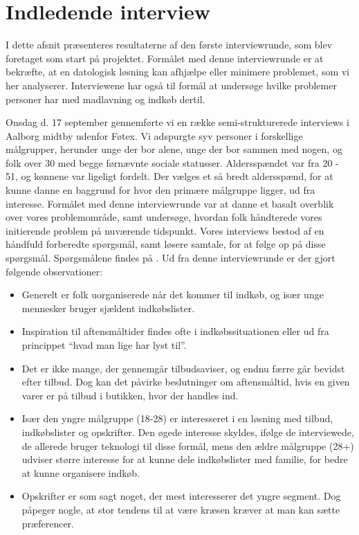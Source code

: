 \section{Indledende interview}\label{section:interview1}
I dette afsnit præsenteres resultaterne af den første interviewrunde, som blev foretaget som start på projektet.
Formålet med denne interviewrunde er at bekræfte, at en datologisk løsning kan afhjælpe eller minimere problemet, som vi her analyserer.
Interviewene har også til formål at undersøge hvilke problemer personer har med madlavning og indkøb dertil.

Onsdag d. 17 september gennemførte vi en række semi-strukturerede interviews i Aalborg midtby udenfor Føtex.
Vi adspurgte syv personer i forskellige målgrupper, herunder unge der bor alene, unge der bor sammen med nogen, og folk over 30 med begge førnævnte sociale statusser.
Aldersspændet var fra 20 - 51, og kønnene var ligeligt fordelt.
Der vælges et så bredt aldersspænd, for at kunne danne en baggrund for hvor den primære målgruppe ligger, ud fra interesse.
Formålet med denne interviewrunde var at danne et basalt overblik over vores problemområde, samt undersøge, hvordan folk håndterede vores initierende problem på nuværende tidspunkt.
Vores interviews bestod af en håndfuld forberedte spørgsmål, samt løsere samtale, for at følge op på disse spørgsmål.
Spørgsmålene findes på .
Ud fra denne interviewrunde er der gjort følgende observationer:
\begin{itemize}
	\item Generelt er folk uorganiserede når det kommer til indkøb, og især unge mennesker bruger sjældent indkøbslister.
	\item Inspiration til aftensmåltider findes ofte i indkøbssituationen eller ud fra princippet “hvad man lige har lyst til”.
	\item Det er ikke mange, der gennemgår tilbudsaviser, og endnu færre går bevidst efter tilbud.
	Dog kan det påvirke beslutninger om aftensmåltid, hvis en given varer er på tilbud i butikken, hvor der handles ind.
	\item Især den yngre målgruppe (18-28) er interesseret i en løsning med tilbud, indkøbslister og opskrifter. Den øgede interesse skyldes, ifølge de interviewede, de allerede bruger teknologi til disse formål, mens den ældre målgruppe (28+) udviser større interesse for at kunne dele indkøbslister med familie, for bedre at kunne organisere indkøb.
	\item Opskrifter er som sagt noget, der mest interesserer det yngre segment.
	Dog påpeger nogle, at stor tendens til at være kræsen kræver at man kan sætte præferencer.
\end{itemize}

